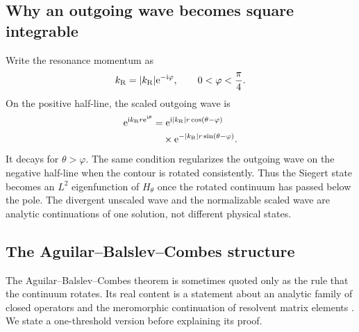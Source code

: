 \subsection{Why an outgoing wave becomes square integrable}
\label{subsec:outgoing-L2}

Write the resonance momentum as
\begin{equation}
  k_{\mathrm{R}}=|k_{\mathrm{R}}|\mathrm{e}^{-\mathrm{i}\varphi},
  \qquad 0<\varphi<\frac{\pi}{4} .
  \label{eq:k-polar}
\end{equation}
On the positive half-line, the scaled outgoing wave is
\begin{align}
  \mathrm{e}^{\mathrm{i} k_{\mathrm{R}}r\mathrm{e}^{\mathrm{i}\theta}}
  &=\mathrm{e}^{
  \mathrm{i}|k_{\mathrm{R}}|r\cos(\theta-\varphi)
  }
  \notag\\
  &\quad\times
  \mathrm{e}^{-|k_{\mathrm{R}}|r
  \sin(\theta-\varphi)} .
  \label{eq:scaled-outgoing}
\end{align}
It decays for $\theta>\varphi$.  The same condition regularizes the outgoing
wave on the negative half-line when the contour is rotated consistently.
Thus the Siegert state becomes an $L^2$ eigenfunction of $H_\theta$ once the
rotated continuum has passed below the pole.  The divergent unscaled wave and
the normalizable scaled wave are analytic continuations of one solution, not
different physical states.

\subsection{The Aguilar--Balslev--Combes structure}
\label{subsec:abc}

The Aguilar--Balslev--Combes theorem is sometimes quoted only as the rule that
the continuum rotates.  Its real content is a statement about an analytic
family of closed operators and the meromorphic continuation of resolvent
matrix elements
\cite{Aguilar:1971ve,Balslev:1971vb,Simon1972BalslevCombes,Simon:73}.
We state a one-threshold version before explaining its proof.

